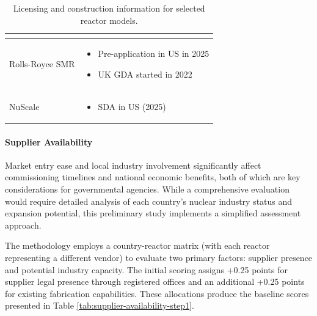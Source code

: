 \begin{table}[!hb]
\begin{tabularx}{\textwidth}{l>{\centering\arraybackslash}X}
\begin{itemize}
          \end{itemize} \\
        \midrule
        Rolls-Royce SMR &
          \begin{itemize}
            \item Pre-application in US in 2025
            \item UK GDA started in 2022
          \end{itemize} \\
        \midrule
        NuScale &
          \begin{itemize}
            \item SDA in US (2025)
          \end{itemize} \\
        \bottomrule
    \end{tabularx}
    \caption{Licensing and construction information for selected reactor models.}
    \label{tab:licensing_info}
\end{table}

\paragraph{Supplier Availability}
Market entry ease and local industry involvement significantly affect commissioning timelines and national economic benefits, both of which are key considerations for governmental agencies. While a comprehensive evaluation would require detailed analysis of each country's nuclear industry status and expansion potential, this preliminary study implements a simplified assessment approach.

The methodology employs a country-reactor matrix (with each reactor representing a different vendor) to evaluate two primary factors: supplier presence and potential industry capacity. The initial scoring assigns +0.25 points for supplier legal presence through registered offices and an additional +0.25 points for existing fabrication capabilities. These allocations produce the baseline scores presented in Table \ref{tab:supplier-availability-step1}.

